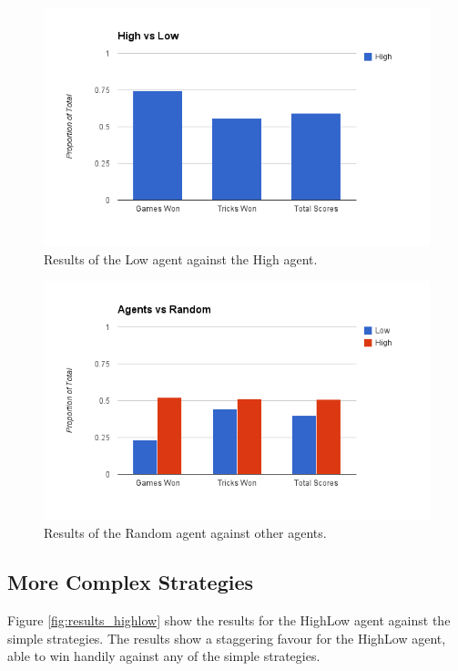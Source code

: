 \begin{figure}[h]
    \centering
    \includegraphics[scale=0.5]{data/low.png}
    \caption{Results of the Low agent against the High agent.}
    \label{fig:results_low}
\end{figure}

\begin{figure}[h]
    \centering
    \includegraphics[scale=0.5]{data/random.png}
    \caption{Results of the Random agent against other agents.}
    \label{fig:results_random}
\end{figure}

\subsection{More Complex Strategies}

Figure \ref{fig:results_highlow} show the results for the HighLow agent against the simple strategies. The results show a staggering
favour for the HighLow agent, able to win handily against any of the simple strategies.


